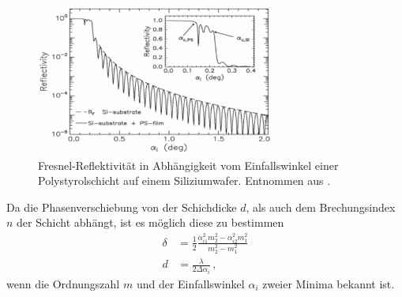         \begin{figure}[h]
            \centering
            \includegraphics[width = 0.7\textwidth]{pictures/Oszi.png}
            \caption{Fresnel-Reflektivität in Abhängigkeit vom Einfallswinkel einer Polystyrolschicht auf einem Siliziumwafer. Entnommen aus \cite{tolan_x-ray_1999}.}
            \label{fig:Oszi}
        \end{figure}
        Da die Phasenverschiebung von der Schichdicke $d$, als auch dem Brechungsindex $n$ der Schicht abhängt,
        ist es möglich diese zu bestimmen
        \begin{align}
            \delta&=\frac{1}{2}\frac{\alpha_{i1}^2m_2^2-\alpha_{i2}^2m_1^2}{m_2^2-m_1^2} \\
            d&=\frac{\lambda}{2\Delta\alpha_i} \, ,
            \label{eqn:d_alpha}
        \end{align}
        wenn die Ordnungszahl $m$ und der Einfallswinkel $\alpha_i$ zweier Minima bekannt ist.
